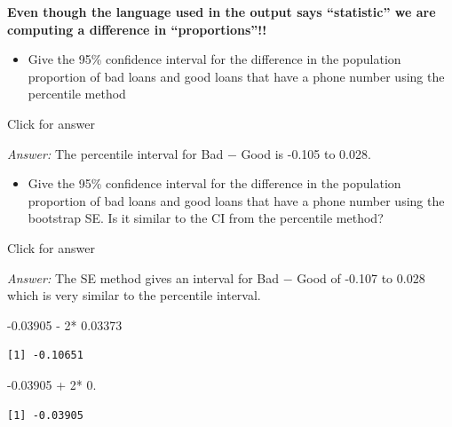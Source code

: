 \documentclass[
]{book}
\newenvironment{Shaded}{\begin{snugshade}}{\end{snugshade}}
\newcommand{\DecValTok}[1]{\textcolor[rgb]{0.00,0.00,0.81}{#1}}
\newcommand{\FloatTok}[1]{\textcolor[rgb]{0.00,0.00,0.81}{#1}}
\newcommand{\SpecialCharTok}[1]{\textcolor[rgb]{0.00,0.00,0.00}{#1}}
\providecommand{\tightlist}{%
  \setlength{\itemsep}{0pt}\setlength{\parskip}{0pt}}
\begin{document}
\textbf{Even though the language used in the output says ``statistic'' we are computing a difference in ``proportions''!!}

\begin{itemize}
\tightlist
\item
  Give the 95\% confidence interval for the difference in the population proportion of bad loans and good loans that have a phone number using the percentile method
\end{itemize}

Click for answer

\emph{Answer:} The percentile interval for Bad \(-\) Good is -0.105 to 0.028.

\vspace*{.3in}

\begin{itemize}
\tightlist
\item
  Give the 95\% confidence interval for the difference in the population proportion of bad loans and good loans that have a phone number using the bootstrap SE. Is it similar to the CI from the percentile method?
\end{itemize}

Click for answer

\emph{Answer:} The SE method gives an interval for Bad \(-\) Good of -0.107 to 0.028 which is very similar to the percentile interval.

\begin{Shaded}
\begin{Highlighting}[]
\SpecialCharTok{{-}}\FloatTok{0.03905} \SpecialCharTok{{-}} \DecValTok{2}\SpecialCharTok{*} \FloatTok{0.03373} 
\end{Highlighting}
\end{Shaded}

\begin{verbatim}
[1] -0.10651
\end{verbatim}

\begin{Shaded}
\begin{Highlighting}[]
\SpecialCharTok{{-}}\FloatTok{0.03905} \SpecialCharTok{+} \DecValTok{2}\SpecialCharTok{*} \FloatTok{0.}
\end{Highlighting}
\end{Shaded}

\begin{verbatim}
[1] -0.03905
\end{verbatim}

\vspace*{.2in}
\end{document}
